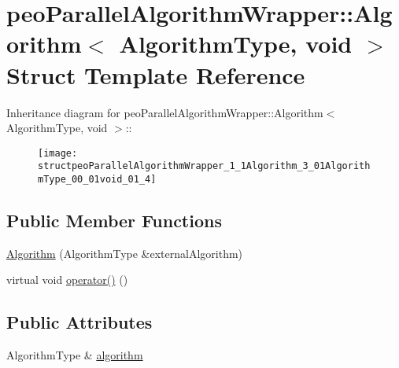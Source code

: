 \hypertarget{structpeoParallelAlgorithmWrapper_1_1Algorithm_3_01AlgorithmType_00_01void_01_4}{
\section{peo\-Parallel\-Algorithm\-Wrapper::Algorithm$<$ Algorithm\-Type, void $>$ Struct Template Reference}
\label{structpeoParallelAlgorithmWrapper_1_1Algorithm_3_01AlgorithmType_00_01void_01_4}
}
Inheritance diagram for peo\-Parallel\-Algorithm\-Wrapper::Algorithm$<$ Algorithm\-Type, void $>$::\begin{figure}[H]
\begin{center}
\leavevmode
\texttt{[image: structpeoParallelAlgorithmWrapper\_1\_1Algorithm\_3\_01AlgorithmType\_00\_01void\_01\_4]}
\end{center}
\end{figure}
\subsection*{Public Member Functions}
\begin{CompactItemize}
\item 
\hypertarget{structpeoParallelAlgorithmWrapper_1_1Algorithm_3_01AlgorithmType_00_01void_01_4_c44d45b69accab079e1fb30d7ddf6b4e}{
\hyperlink{structpeoParallelAlgorithmWrapper_1_1Algorithm_3_01AlgorithmType_00_01void_01_4_c44d45b69accab079e1fb30d7ddf6b4e}{Algorithm} (Algorithm\-Type \&external\-Algorithm)}
\label{structpeoParallelAlgorithmWrapper_1_1Algorithm_3_01AlgorithmType_00_01void_01_4_c44d45b69accab079e1fb30d7ddf6b4e}

\item 
\hypertarget{structpeoParallelAlgorithmWrapper_1_1Algorithm_3_01AlgorithmType_00_01void_01_4_27b5bd346932e7f3ba9dd8c9e0dd952b}{
virtual void \hyperlink{structpeoParallelAlgorithmWrapper_1_1Algorithm_3_01AlgorithmType_00_01void_01_4_27b5bd346932e7f3ba9dd8c9e0dd952b}{operator()} ()}
\label{structpeoParallelAlgorithmWrapper_1_1Algorithm_3_01AlgorithmType_00_01void_01_4_27b5bd346932e7f3ba9dd8c9e0dd952b}

\end{CompactItemize}
\subsection*{Public Attributes}
\begin{CompactItemize}
\item 
\hypertarget{structpeoParallelAlgorithmWrapper_1_1Algorithm_3_01AlgorithmType_00_01void_01_4_7dcb305dd8c78ffac232bd86b913183d}{
Algorithm\-Type \& \hyperlink{structpeoParallelAlgorithmWrapper_1_1Algorithm_3_01AlgorithmType_00_01void_01_4_7dcb305dd8c78ffac232bd86b913183d}{algorithm}}
\label{structpeoParallelAlgorithmWrapper_1_1Algorithm_3_01AlgorithmType_00_01void_01_4_7dcb305dd8c78ffac232bd86b913183d}

\end{CompactItemize}


